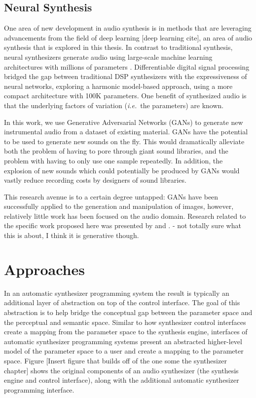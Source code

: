 \subsection{Neural Synthesis}
One area of new development in audio synthesis is in methods that are leveraging advancements from the field of deep learning [deep learning cite], an area of audio synthesis that is explored in this thesis.  
In contrast to traditional synthesis, neural synthesizers generate audio using large-scale machine learning architectures with millions of parameters \cite{engel2017neural}. Differentiable digital signal processing \cite{engel2020ddsp} bridged the gap between traditional DSP synthesizers with the expressiveness of neural networks, exploring a harmonic model-based approach, using a more compact architecture with 100K parameters.
One benefit of synthesized audio is that the underlying factors of variation ({\em i.e.}~the parameters) are known.

In this work, we use Generative Adversarial Networks (GANs) \cite{goodfellow2014generative} to generate new instrumental audio from a dataset of existing material. GANs have the potential to be used to generate new sounds on the fly. This would dramatically alleviate both the problem of having to pore through giant sound libraries, and the problem with having to only use one sample repeatedly. In addition, the explosion of new sounds which could potentially be produced by GANs would vastly reduce recording costs by designers of sound libraries.

This research avenue is to a certain degree untapped: GANs have been successfully applied to the generation and manipulation of images, however, relatively little work has been focused on the audio domain. Research related to the specific work proposed here was presented by \cite{donahue2018adversarial}  and \cite{engel2018gansynth}.
\cite{ccakir2018musical} - not totally sure what this is about, I think it is generative though.


\section{Approaches}
In an automatic synthesizer programming system the result is typically an additional layer of abstraction on top of the control interface. The goal of this abstraction is to help bridge the conceptual gap between the parameter space and the perceptual and semantic space. Similar to how synthesizer control interfaces create a mapping from the parameter space to the synthesis engine, interfaces of automatic synthesizer programming systems present an abstracted higher-level model of the parameter space to a user and create a mapping to the parameter space. Figure [Insert figure that builds off of the one some the synthesizer chapter] shows the original components of an audio synthesizer (the synthesis engine and control interface), along with the additional automatic synthesizer programming interface.

